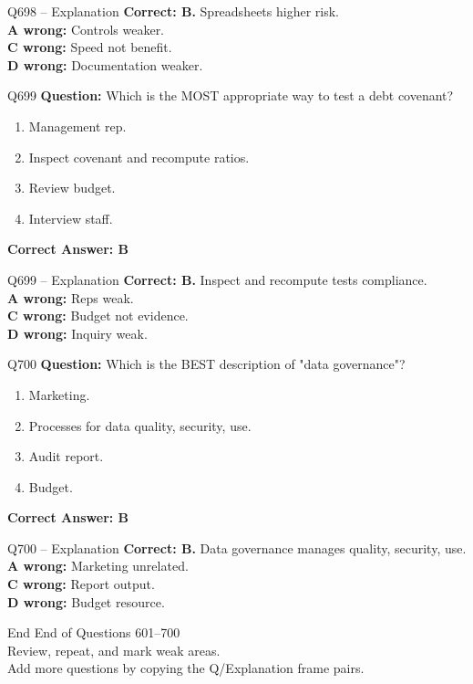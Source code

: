 \documentclass[aspectratio=169,10pt]{beamer}
\begin{document}
	\begin{frame}[t]{Q698 -- Explanation}
		\small
		\textbf{Correct: B.} Spreadsheets higher risk. \\[4pt]
		\textbf{A wrong:} Controls weaker. \\[2pt]
		\textbf{C wrong:} Speed not benefit. \\[2pt]
		\textbf{D wrong:} Documentation weaker.
	\end{frame}
	
	\begin{frame}[t]{Q699}
		\small
		\textbf{Question:} Which is the MOST appropriate way to test a debt covenant?
		\begin{enumerate}[label=\Alph*.,itemsep=1pt,topsep=2pt]
			\item Management rep.
			\item Inspect covenant and recompute ratios.
			\item Review budget.
			\item Interview staff.
		\end{enumerate}
		\vspace{4pt}
		\textbf{Correct Answer: B}
	\end{frame}
	
	\begin{frame}[t]{Q699 -- Explanation}
		\small
		\textbf{Correct: B.} Inspect and recompute tests compliance. \\[4pt]
		\textbf{A wrong:} Reps weak. \\[2pt]
		\textbf{C wrong:} Budget not evidence. \\[2pt]
		\textbf{D wrong:} Inquiry weak.
	\end{frame}
	
	\begin{frame}[t]{Q700}
		\small
		\textbf{Question:} Which is the BEST description of "data governance"?
		\begin{enumerate}[label=\Alph*.,itemsep=1pt,topsep=2pt]
			\item Marketing.
			\item Processes for data quality, security, use.
			\item Audit report.
			\item Budget.
		\end{enumerate}
		\vspace{4pt}
		\textbf{Correct Answer: B}
	\end{frame}
	
	\begin{frame}[t]{Q700 -- Explanation}
		\small
		\textbf{Correct: B.} Data governance manages quality, security, use. \\[4pt]
		\textbf{A wrong:} Marketing unrelated. \\[2pt]
		\textbf{C wrong:} Report output. \\[2pt]
		\textbf{D wrong:} Budget resource.
	\end{frame}
	
	\begin{frame}{End}
		\centering
		\Large End of Questions 601--700\\[8pt]
		\normalsize Review, repeat, and mark weak areas.\\[4pt]
		\small Add more questions by copying the Q/Explanation frame pairs.
	\end{frame}
	
\end{document}

